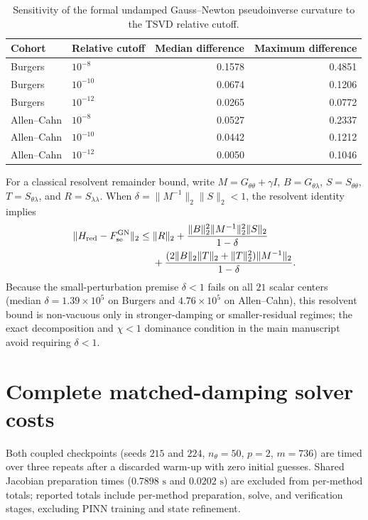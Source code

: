 \documentclass[10pt,letterpaper]{article}
\begin{document}
\begin{table}[!htbp]
\centering\small
\caption{Sensitivity of the formal undamped Gauss--Newton pseudoinverse curvature to the TSVD relative cutoff.}
\begin{tabular}{llrr}
\toprule
Cohort & Relative cutoff & Median difference & Maximum difference\\\midrule
Burgers & $10^{-8}$ & 0.1578 & 0.4851\\
Burgers & $10^{-10}$ & 0.0674 & 0.1206\\
Burgers & $10^{-12}$ & 0.0265 & 0.0772\\
Allen--Cahn & $10^{-8}$ & 0.0527 & 0.2337\\
Allen--Cahn & $10^{-10}$ & 0.0442 & 0.1212\\
Allen--Cahn & $10^{-12}$ & 0.0050 & 0.1046\\\bottomrule
\end{tabular}
\end{table}

For a classical resolvent remainder bound, write $M=G_{\theta\theta}+\gamma I$, $B=G_{\theta\lambda}$, $S=S_{\theta\theta}$, $T=S_{\theta\lambda}$, and $R=S_{\lambda\lambda}$.
When $\delta=\|M^{-1}\|_2\|S\|_2<1$, the resolvent identity implies
\begin{align}
 \|H_{\rm red}-F_{\rm se}^{\rm GN}\|_2
 \le{}&\|R\|_2+
 \frac{\|B\|_2^2\|M^{-1}\|_2^2\|S\|_2}{1-\delta}\\
 &+\frac{(2\|B\|_2\|T\|_2+\|T\|_2^2)\|M^{-1}\|_2}{1-\delta}.
\end{align}
Because the small-perturbation premise $\delta<1$ fails on all $21$ scalar centers (median $\delta=1.39\times10^5$ on Burgers and $4.76\times10^5$ on Allen--Cahn), this resolvent bound is non-vacuous only in stronger-damping or smaller-residual regimes; the exact decomposition and $\chi<1$ dominance condition in the main manuscript avoid requiring $\delta<1$.

\section{Complete matched-damping solver costs}
Both coupled checkpoints (seeds $215$ and $224$, $n_\theta=50$, $p=2$, $m=736$) are timed over three repeats after a discarded warm-up with zero initial guesses.
Shared Jacobian preparation times ($0.7898\text{ s}$ and $0.0202\text{ s}$) are excluded from per-method totals; reported totals include per-method preparation, solve, and verification stages, excluding PINN training and state refinement.
\end{document}
